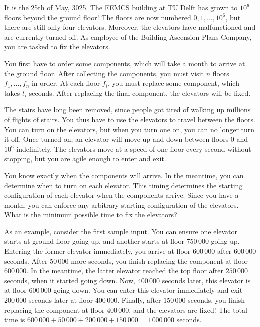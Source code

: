 

\newcommand{\maxn}{35}
\newcommand{\maxt}{10^9}
\newcommand{\maxa}{10^{18}}
\newcommand{\maxf}{10^6}

It is the 25th of May, 3025.
The EEMCS building at TU Delft has grown to $\maxf$ floors beyond the ground floor!
The floors are now numbered $0,1,\ldots,\maxf$, but there are still only four elevators.
Moreover, the elevators have malfunctioned and are currently turned off.
As employee of the Building Ascension Plans Company, you are tasked to fix the elevators.

You first have to order some components, which will take a month to arrive at the ground floor.
After collecting the components, you must visit $n$ floors $f_1,\ldots,f_n$ in order.
At each floor $f_i$, you must replace some component, which takes $t_i$ seconds.
After replacing the final component, the elevators will be fixed.

The stairs have long been removed, since people got tired of walking up millions of flights of stairs.
You thus have to use the elevators to travel between the floors.
You can turn on the elevators, but when you turn one on, you can no longer turn it off.
Once turned on, an elevator will move up and down between floors $0$ and $\maxf$ indefinitely.
The elevators move at a speed of one floor every second without stopping, but you are agile enough to enter and exit.

You know exactly when the components will arrive.
In the meantime, you can determine when to turn on each elevator.
This timing determines the starting configuration of each elevator when the components arrive.
Since you have a month, you can enforce any arbitrary starting configuration of the elevators.
What is the minimum possible time to fix the elevators?

As an example, consider the first sample input.
You can ensure one elevator starts at ground floor going up, and another starts at floor $750\,000$ going up.
Entering the former elevator immediately, you arrive at floor $600\,000$ after $600\,000$ seconds.
After $50\,000$ more seconds, you finish replacing the component at floor $600\,000$.
In the meantime, the latter elevator reached the top floor after $250\,000$ seconds, when it started going down.
Now, $400\,000$ seconds later, this elevator is at floor $600\,000$ going down.
You can enter this elevator immediately and exit $200\,000$ seconds later at floor $400\,000$.
Finally, after $150\,000$ seconds, you finish replacing the component at floor $400\,000$, and the elevators are fixed!
The total time is $600\,000+50\,000+200\,000+150\,000=1\,000\,000$ seconds.

